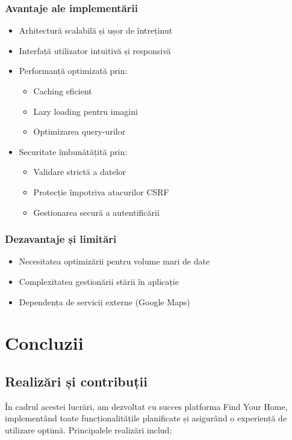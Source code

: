 \documentclass[12pt,a4paper]{report}
\begin{document}
\subsection{Avantaje ale implementării}
\begin{itemize}
    \item Arhitectură scalabilă și ușor de întreținut
    \item Interfață utilizator intuitivă și responsivă
    \item Performanță optimizată prin:
    \begin{itemize}
        \item Caching eficient
        \item Lazy loading pentru imagini
        \item Optimizarea query-urilor
    \end{itemize}
    \item Securitate îmbunătățită prin:
    \begin{itemize}
        \item Validare strictă a datelor
        \item Protecție împotriva atacurilor CSRF
        \item Gestionarea secură a autentificării
    \end{itemize}
\end{itemize}

\subsection{Dezavantaje și limitări}
\begin{itemize}
    \item Necesitatea optimizării pentru volume mari de date
    \item Complexitatea gestionării stării în aplicație
    \item Dependența de servicii externe (Google Maps)
\end{itemize}

\chapter{Concluzii}
\section{Realizări și contribuții}
În cadrul acestei lucrări, am dezvoltat cu succes platforma Find Your Home, implementând toate funcționalitățile planificate și asigurând o experiență de utilizare optimă. Principalele realizări includ:
\end{document}
